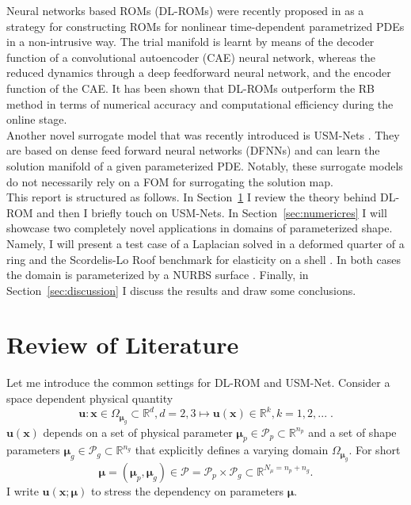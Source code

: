 \documentclass[11pt]{article}
\begin{document}
Neural networks based ROMs (DL-ROMs) were recently proposed in \cite{fresca2021comprehensive} as a strategy for constructing ROMs for nonlinear time-dependent parametrized PDEs in a non-intrusive way. The trial manifold is learnt by means of the decoder function of a convolutional autoencoder (CAE) neural network, whereas the reduced dynamics through a deep feedforward neural network, and the encoder function of the CAE. It has been shown that DL-ROMs outperform the RB method in terms of numerical accuracy and computational efficiency during the online stage.\\

Another novel surrogate model that was recently introduced is USM-Nets \cite{regazzoni2022}. They are based on dense feed forward neural networks (DFNNs) and
can learn the solution manifold of a given parameterized PDE. Notably, these surrogate models do not necessarily rely on a FOM for surrogating the solution map.\\

This report is structured as follows. In Section~\ref{sec:review} I review the theory behind DL-ROM and then I briefly touch on USM-Nets.  In Section~\ref{sec:numericres} I will showcase two completely novel applications in domains of parameterized shape. Namely, I will present a test case of a Laplacian solved in a deformed quarter of a ring and the Scordelis-Lo Roof benchmark for elasticity on a shell \cite{reddy2006theory}. In both cases the domain is parameterized by a NURBS surface \cite{piegl1996nurbs}. Finally, in Section~\ref{sec:discussion} I discuss the results and draw some conclusions.

\section{Review of Literature}\label{sec:review}
Let me introduce the common settings for DL-ROM and USM-Net. Consider a space dependent physical quantity
$$\mathbf u: \mathbf x\in\Omega_{\boldsymbol \mu_g}\subset\mathbb R^d, d=2,3 \mapsto \mathbf u( \mathbf x) \in \mathbb R^k, k=1,2,... \; .$$
$\mathbf u( \mathbf x)$ depends on a set of physical parameter $\boldsymbol \mu_p\in\mathcal P_p \subset \mathbb R^{n_p}$ 
and a set of shape parameters $\boldsymbol \mu_g\in\mathcal P_g \subset\mathbb R^{n_g}$ 
that explicitly defines a varying domain $\Omega_{\boldsymbol \mu_g}$. 
For short
$$\boldsymbol \mu = (\boldsymbol \mu_p, \boldsymbol \mu_g) \in \mathcal P = \mathcal P_p \times \mathcal P_g \subset \mathbb R^{N_\mu = n_p + n_g}.$$ 
I write $\mathbf u( \mathbf x; \boldsymbol \mu)$ to stress the dependency on parameters $\boldsymbol \mu$.
\end{document}
